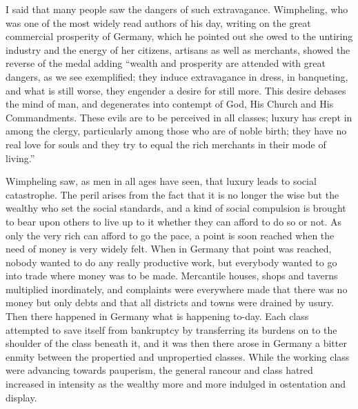 \documentclass{book}
\begin{document}
I said that many people saw the dangers of such extravagance. Wimpheling, who was one of the most widely read authors of his day, writing on the great commercial prosperity of Germany, which he pointed out she owed to the untiring industry and the energy of her citizens, artisans as well as merchants, showed the reverse of the medal adding “wealth and prosperity are attended with great dangers, as we see exemplified; they induce extravagance in dress, in banqueting, and what is still worse, they engender a desire for still more. This desire debases the mind of man, and degenerates into contempt of God, His Church and His Commandments. These evils are to be perceived in all classes; luxury has crept in among the clergy, particularly among those who are of noble birth; they have no real love for souls and they try to equal the rich merchants in their mode of living.”\footnotemark[7]

Wimpheling saw, as men in all ages have seen, that luxury leads to social catastrophe. The peril arises from the fact that it is no longer the wise but the wealthy who set the social standards, and a kind of social compulsion is brought to bear upon others to live up to it whether they can afford to do so or not. As only the very rich can afford to go the pace, a point is soon reached when the need of money is very widely felt. When in Germany that point was reached, nobody wanted to do any really productive work, but everybody wanted to go into trade where money was to be made. Mercantile houses, shops and taverns multiplied inordinately, and complaints were everywhere made that there was no money but only debts and that all districts and towns were drained by usury. Then there happened in Germany what is happening to-day. Each class attempted to save itself from bankruptcy by transferring its burdens on to the shoulder of the class beneath it, and it was then there arose in Germany a bitter enmity between the propertied and unpropertied classes. While the working class were advancing towards pauperism, the general rancour and class hatred increased in intensity as the wealthy more and more indulged in ostentation and display.
\end{document}
